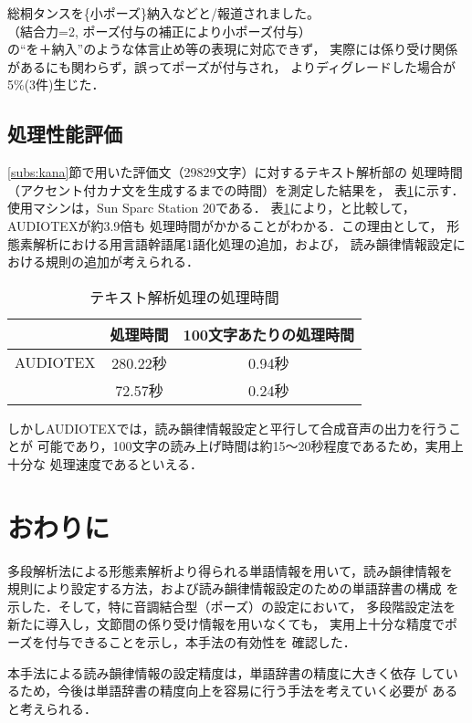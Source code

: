 総桐タンスを\{小ポーズ\}納入などと/報道されました。\\
\hspace*{1cm}（結合力=2, ポーズ付与の補正により小ポーズ付与）\\
の``を＋納入''のような体言止め等の表現に対応できず，
\mbox{実際には係り受け関係があるにも関わ}らず，誤ってポーズが付与され，
\cite{Miyazaki1}よりディグレードした場合が5\%(3件)生じた．

\subsection{処理性能評価}
\ref{subs:kana}節で用いた評価文（29829文字）に対するテキスト解析部の
処理時間（アクセント付カナ文を生成するまでの時間）を測定した結果を，
表\ref{tab:speed}に示す．使用マシンは，Sun Sparc Station 20である．
表\ref{tab:speed}により，\cite{Miyazaki1}と比較して，AUDIOTEXが約3.9倍も
処理時間がかかることがわかる．この理由として，
形態素解析における用言語幹語尾1語化処理の追加，および，
読み韻律情報設定における規則の追加が考えられる．

\begin{table}[bt]
\caption{テキスト解析処理の処理時間}
\label{tab:speed}
\begin{center}
\begin{tabular}{l|c|c}\hline
	& 処理時間	& 100文字あたりの処理時間 \\ \hline
AUDIOTEX & 280.22秒	& 0.94秒 \\
\cite{Miyazaki1} & 72.57秒	& 0.24秒 \\ \hline
\end{tabular}
\end{center}
\end{table}

しかしAUDIOTEXでは，読み韻律情報設定と平行して合成音声の出力を行うことが
可能であり，100文字の読み上げ時間は約15〜20秒程度であるため，実用上十分な
処理速度であるといえる．

\section{おわりに}\label{sec:conclusion}
多段解析法による形態素解析より得られる単語情報を用いて，読み韻律情報を
規則により設定する方法，および読み韻律情報設定のための単語辞書の構成
を示した．そして，特に音調結合型（ポーズ）の設定において，
多段階設定法を新たに導入し，文節間の係り受け情報を用いなくても，
実用上十分な精度でポーズを付与できることを示し，本手法の有効性を
確認した．

本手法による読み韻律情報の設定精度は，単語辞書の精度に大きく依存
しているため，今後は単語辞書の精度向上を容易に行う手法を考えていく必要が
あると考えられる．

